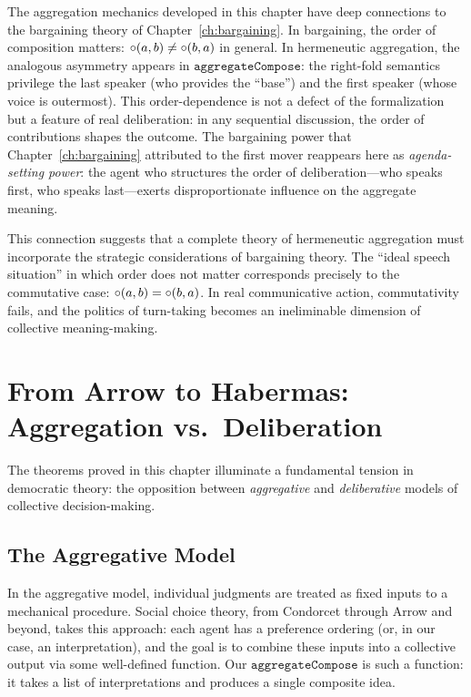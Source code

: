 \begin{remark}
\label{rem:connection_bargaining}
The aggregation mechanics developed in this chapter have deep connections
to the bargaining theory of Chapter~\ref{ch:bargaining}.  In bargaining,
the order of composition matters: $\circ(a, b) \neq \circ(b, a)$
in general.  In hermeneutic aggregation, the analogous asymmetry appears
in $\texttt{aggregateCompose}$: the right-fold semantics privilege the
last speaker (who provides the ``base'') and the first speaker (whose
voice is outermost).  This order-dependence is not a defect of the
formalization but a feature of real deliberation: in any sequential
discussion, the order of contributions shapes the outcome.  The bargaining
power that Chapter~\ref{ch:bargaining} attributed to the first mover
reappears here as \emph{agenda-setting power}: the agent who structures
the order of deliberation---who speaks first, who speaks last---exerts
disproportionate influence on the aggregate meaning.

This connection suggests that a complete theory of hermeneutic aggregation
must incorporate the strategic considerations of bargaining theory.
The ``ideal speech situation'' in which order does not matter corresponds
precisely to the commutative case: $\circ(a, b) = \circ(b, a)$.
In real communicative action, commutativity fails, and the politics of
turn-taking becomes an ineliminable dimension of collective meaning-making.
\end{remark}

\section{From Arrow to Habermas: Aggregation vs.\ Deliberation}
\label{sec:ch19-arrow-habermas}

The theorems proved in this chapter illuminate a fundamental tension in
democratic theory: the opposition between \emph{aggregative} and
\emph{deliberative} models of collective decision-making.

\subsection{The Aggregative Model}

In the aggregative model, individual judgments are treated as fixed inputs
to a mechanical procedure.  Social choice theory, from Condorcet through
Arrow and beyond, takes this approach: each agent has a preference ordering
(or, in our case, an interpretation), and the goal is to combine these
inputs into a collective output via some well-defined function.  Our
$\texttt{aggregateCompose}$ is such a function: it takes a list of
interpretations and produces a single composite idea.

